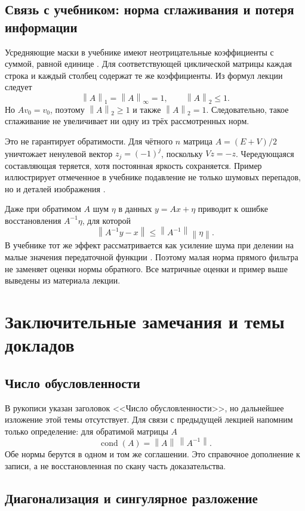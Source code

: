 \documentclass[12pt,a4paper]{article}
\theoremstyle{definition}
\theoremstyle{remark}
\DeclareMathOperator{\cond}{cond}
\newcommand{\norm}[1]{\left\lVert #1\right\rVert}
\begin{document}
\subsection{Связь с учебником: норма сглаживания и потеря информации}

Усредняющие маски в учебнике имеют неотрицательные коэффициенты
с суммой, равной единице \cite[\S\,3.5.1, с.~195]{GW2012}.
Для соответствующей циклической матрицы каждая строка и каждый
столбец содержат те же коэффициенты. Из формул лекции следует
\[
  \norm{A}_1=\norm{A}_\infty=1,\qquad
  \norm{A}_2\leqslant1.
\]
Но $Av_0=v_0$, поэтому $\norm{A}_2\geqslant1$ и также
$\norm{A}_2=1$. Следовательно, такое сглаживание не увеличивает
ни одну из трёх рассмотренных норм.

Это не гарантирует обратимости. Для чётного $n$ матрица
$A=(E+V)/2$ уничтожает ненулевой вектор $z_j=(-1)^j$,
поскольку $Vz=-z$. Чередующаяся составляющая теряется,
хотя постоянная яркость сохраняется. Пример иллюстрирует отмеченное
в учебнике подавление не только шумовых перепадов, но и деталей
изображения \cite[\S\,3.5.1, с.~195]{GW2012}.

Даже при обратимом $A$ шум $\eta$ в данных $y=Ax+\eta$
приводит к ошибке восстановления $A^{-1}\eta$, для которой
\[
  \norm{A^{-1}y-x}\leqslant\norm{A^{-1}}\norm{\eta}.
\]
В учебнике тот же эффект рассматривается как усиление шума
при делении на малые значения передаточной функции
\cite[\S\,5.7, с.~412]{GW2012}.
Поэтому малая норма прямого фильтра не заменяет оценки нормы
обратного. Все матричные оценки и пример выше выведены
из материала лекции.

\section{Заключительные замечания и темы докладов}

\subsection{Число обусловленности}

В рукописи указан заголовок <<Число обусловленности>>, но дальнейшее
изложение этой темы отсутствует. Для связи с предыдущей лекцией напомним
только определение: для обратимой матрицы $A$
\[
  \cond(A)=\norm{A}\,\norm{A^{-1}}.
\]
Обе нормы берутся в одном и том же соглашении. Это справочное дополнение
к записи, а не восстановленная по скану часть доказательства.

\subsection{Диагонализация и сингулярное разложение}
\end{document}
